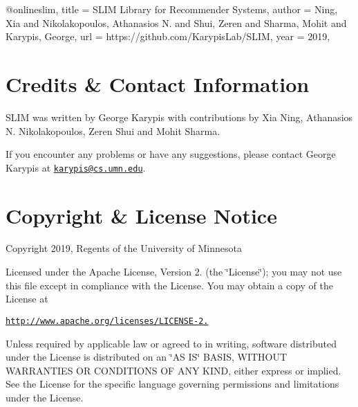 \begin{DoxyVerb}@online{slim,
  title = {{SLIM Library for Recommender Systems}},
  author = {Ning, Xia and Nikolakopoulos, Athanasios N. and Shui, Zeren and Sharma, Mohit and Karypis, George},
  url = {https://github.com/KarypisLab/SLIM},
  year = {2019},
}
\end{DoxyVerb}
\hypertarget{index_contact}{}\section{Credits \& Contact Information}\label{index_contact}
S\+L\+IM was written by George Karypis with contributions by Xia Ning, Athanasios N. Nikolakopoulos, Zeren Shui and Mohit Sharma.

If you encounter any problems or have any suggestions, please contact George Karypis at \href{mailto:karypis@cs.umn.edu}{\tt karypis@cs.\+umn.\+edu}.\hypertarget{index_license}{}\section{Copyright \& License Notice}\label{index_license}
Copyright 2019, Regents of the University of Minnesota

Licensed under the Apache License, Version 2. (the \char`\"{}\+License\char`\"{}); you may not use this file except in compliance with the License. You may obtain a copy of the License at

\href{http://www.apache.org/licenses/LICENSE-2.0}{\tt http\+://www.\+apache.\+org/licenses/\+L\+I\+C\+E\+N\+S\+E-\/2.}

Unless required by applicable law or agreed to in writing, software distributed under the License is distributed on an \char`\"{}\+A\+S I\+S\char`\"{} B\+A\+S\+IS, W\+I\+T\+H\+O\+UT W\+A\+R\+R\+A\+N\+T\+I\+ES OR C\+O\+N\+D\+I\+T\+I\+O\+NS OF A\+NY K\+I\+ND, either express or implied. See the License for the specific language governing permissions and limitations under the License. 